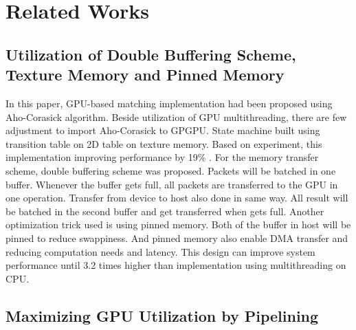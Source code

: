 \documentclass[conference]{IEEEtran}
\begin{document}
\section{Related Works}

    \subsection{Utilization of Double Buffering Scheme, Texture Memory and Pinned Memory}

        In this paper, GPU-based matching implementation had been proposed using Aho-Corasick algorithm. Beside utilization of GPU multithreading, there are few adjustment to import Aho-Corasick to GPGPU. State machine built using transition table on 2D table on texture memory. Based on experiment, this implementation improving performance by 19\% \cite{gnort2008}.
        For the memory transfer scheme, double buffering scheme was proposed. Packets will be batched in one buffer. Whenever the buffer gets full, all packets are transferred to the GPU in one operation. Transfer from device to host also done in same way. All result will be batched in the second buffer and get transferred when gets full.
        Another optimization trick used is using pinned memory. Both of the buffer in host will be pinned to reduce swappiness. And pinned memory also enable DMA transfer and reducing computation needs and latency. This design can improve system performance until 3.2 times higher than implementation using multithreading on CPU.

    \subsection{Maximizing GPU Utilization by Pipelining}


\end{document}
